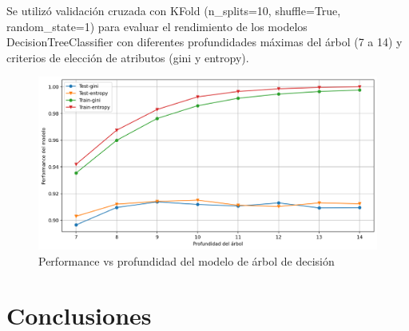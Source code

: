 \documentclass[11pt,a4paper, twocolumn]{article}
\begin{document}
\begin{itemize}
Se utilizó validación cruzada con KFold (n\_splits=10, shuffle=True, random\_state=1) para evaluar el rendimiento de los modelos DecisionTreeClassifier con diferentes profundidades máximas del árbol (7 a 14) y criterios de elección de atributos (gini y entropy). 

\begin{figure}[H]
	\centering
	\includegraphics[scale=0.6]{figuras/3c_entropy10.png}
	\caption{Performance vs profundidad del modelo de árbol de decisión}
	\label{fig:3c}
\end{figure}



\end{itemize}



\section{Conclusiones}
\end{document}
